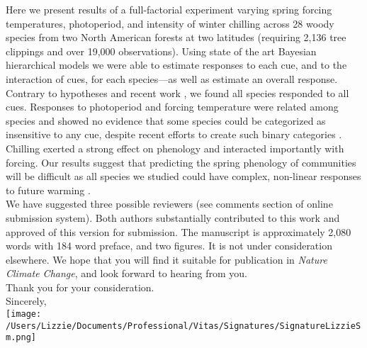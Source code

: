 \documentclass[11pt,a4paper]{article}
\begin{document}
Here we present results of a full-factorial experiment varying spring forcing temperatures, photoperiod, and intensity of winter chilling across 28 woody species from two North American forests at two latitudes (requiring 2,136 tree clippings and over 19,000 observations). Using state of the art Bayesian hierarchical models we were able to estimate responses to each cue, and to the interaction of cues, for each species---as well as estimate an overall response. Contrary to hypotheses \citep{Korner:2010} and recent work \citep[using methods that do not manipulate all cues,][]{zohner2016ncc}, we found all species responded to all cues. Responses to photoperiod and forcing temperature were related among species and showed no evidence that some species could be categorized as insensitive to any cue, despite recent efforts to create such binary categories \citep{laube2014gcb,zohner2016ncc,donnelly2017}. Chilling exerted a strong effect on phenology and interacted importantly with forcing. Our results suggest that predicting the spring phenology of communities will be difficult as all species we studied could have complex, non-linear responses to future warming \citep{Chuine:1999aa}. 
\vspace{1.5ex}\\
We have suggested three possible reviewers (see comments section of online submission system). Both authors substantially contributed to this work and approved of this version for submission. The manuscript is approximately 2,080 words with 184 word preface, and two figures. It is not under consideration elsewhere. We hope that you will find it suitable for publication in \emph{Nature Climate Change}, and look forward to hearing from you.
\vspace{1.5ex}\\
Thank you for your consideration.
\vspace{1.5ex}\\
\noindent Sincerely,\\

 \texttt{[image: /Users/Lizzie/Documents/Professional/Vitas/Signatures/SignatureLizzieSm.png]} 
\newpage
{}
\vspace{-5ex}

\renewcommand{\refname}{\CHead{}}

\end{document}

